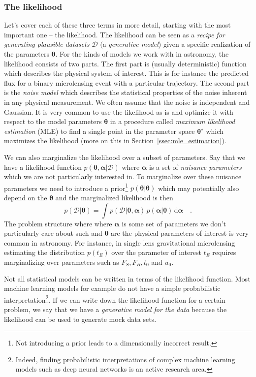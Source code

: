 \documentclass[12pt]{report}
\newcommand{\ud}{\,\mathrm{d}}
\renewcommand{\vec}[1]{\boldsymbol{\mathbf{#1}}}
\begin{document}
\subsubsection{The likelihood}
Let's cover each of these three terms in more detail, starting with the most
important one -- the likelihood. The likelihood can be seen as a \emph{recipe
    for generating plausible datasets $\mathcal{D}$} (a \emph{generative model})
given a specific realization of the parameters $\vec{\theta}$. For the kinds of
models we work with in astronomy, the likelihood consists of two parts. The
first part is (usually deterministic) function which describes the physical
system of interest. This is for instance the predicted flux for a binary
microlensing event with a particular trajectory. The second part is the
\emph{noise model} which describes the statistical properties of the noise
inherent in any physical measurement. We often assume that the noise is
independent and Gaussian. It is very common to use the likelihood as is and
optimize it with respect to the model parameters $\vec{\theta}$ in a procedure
called \emph{maximum likelihood estimation} (MLE) to find a single point in the
parameter space $\vec{\theta}^\star$ which maximizes the likelihood (more on
this in Section~\ref{ssec:mle_estimation}).

We can also marginalize the likelihood over a subset of parameters. Say that we
have a likelihood function $p(\vec{\theta} ,\vec{\alpha}|\mathcal{D})$ where
$\vec{\alpha}$ is a set of \emph{nuisance parameters} which we are not
particularly interested in. To marginalize over these nuisance parameters we
need to introduce a prior\footnote{Not introducing a prior leads to a
    dimensionally incorrect result.} $p(\vec{\theta}|\vec{\theta})$ which may
potentially also depend on the $\vec{\theta}$ and the marginalized likelihood
is then
\begin{equation}
    p(\mathcal{D} | \vec{\theta})=\int p(\mathcal{D} | \vec{\theta}, \vec{\alpha})\,p(\vec{\alpha} |\vec{\theta}) \ud \vec{\alpha}\quad .
\end{equation}
The problem structure where where $\vec{\alpha}$ is some set of parameters
we don't particularly care about such and $\vec{\theta}$ are the physical
parameters of interest is very common in astronomy. For instance, in single lens gravitational microlensing estimating
the distribution $p(t_E)$ over the parameter of interest $t_E$ requires marginalizing over
parameters such as $F_S, F_B, t_0$ and $u_0$.

Not all statistical models can be written in terms of the likelihood function.
Most machine learning models for example do not have a simple probabilistic
interpretation\footnote{Indeed, finding probabilistic interpretations of
    complex machine learning models such as deep neural networks is an active
    research area.}. If we can write down the likelihood function for a certain
problem, we say that we have a \emph{generative model for the data} because the
likelihood can be used to generate mock data sets.
\end{document}
